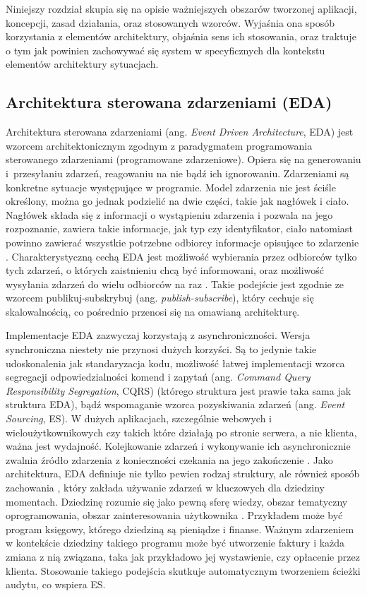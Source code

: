 \documentclass[a4paper]{book}
\newcommand{\obcy}[2]{{\selectlanguage{#1}#2}}
\newcommand{\ang}[1]{\emph{\obcy{british}{#1}}}
\begin{document}
{Niniejszy rozdział skupia się na opisie ważniejszych obszarów tworzonej aplikacji, koncepcji, zasad działania, oraz stosowanych wzorców. Wyjaśnia ona sposób korzystania z elementów architektury, objaśnia sens ich stosowania, oraz traktuje o tym jak powinien zachowywać się system w specyficznych dla kontekstu elementów architektury sytuacjach.

\subsection{Architektura sterowana zdarzeniami (EDA)}
Architektura sterowana zdarzeniami (ang. \ang{Event Driven Architecture}, EDA) jest wzorcem architektonicznym zgodnym z paradygmatem programowania sterowanego zdarzeniami (programowane zdarzeniowe). Opiera się na generowaniu i~przesyłaniu zdarzeń, reagowaniu na nie bądź ich ignorowaniu. Zdarzeniami są konkretne sytuacje występujące w programie. Model zdarzenia nie jest ściśle określony, można go jednak podzielić na dwie części, takie jak nagłówek i ciało. Nagłówek składa się z informacji o wystąpieniu zdarzenia i pozwala na jego rozpoznanie, zawiera takie informacje, jak typ czy identyfikator, ciało natomiast powinno zawierać wszystkie potrzebne odbiorcy informacje opisujące to zdarzenie \cite{id:EDA_BrendaMichelson}. Charakterystyczną cechą EDA jest możliwość wybierania przez odbiorców tylko tych zdarzeń, o których zaistnieniu chcą być informowani, oraz możliwość wysyłania zdarzeń do wielu odbiorców na raz \cite{id:maximeKlusman}. Takie podejście jest zgodnie ze wzorcem publikuj-subskrybuj (ang. \ang{publish-subscribe}), który cechuje się skalowalnością, co pośrednio przenosi się na omawianą architekturę.

Implementacje EDA zazwyczaj korzystają z asynchroniczności. Wersja synchroniczna niestety nie przynosi dużych korzyści. Są to jedynie takie udoskonalenia jak standaryzacja kodu, możliwość łatwej implementacji wzorca segregacji odpowiedzialności komend i zapytań (ang. \ang{Command Query Responsibility Segregation}, CQRS) (którego struktura jest prawie taka sama jak struktura EDA), bądź wspomaganie wzorca pozyskiwania zdarzeń (ang. \ang{Event Sourcing}, ES). W dużych aplikacjach, szczególnie webowych i wieloużytkownikowych czy takich które działają po stronie serwera, a nie klienta, ważna jest wydajność. Kolejkowanie zdarzeń i wykonywanie ich asynchronicznie zwalnia źródło zdarzenia z konieczności czekania na jego zakończenie \cite{id:hohpe2006programming,id:maximeKlusman}. Jako architektura, EDA definiuje nie tylko pewien rodzaj struktury, ale również sposób zachowania \cite{id:ibm_Architecture}, który zakłada używanie zdarzeń w kluczowych dla dziedziny momentach. Dziedzinę rozumie się jako pewną sferę wiedzy, obszar tematyczny oprogramowania, obszar zainteresowania użytkownika \cite{id:sobotka_SDJ-DDD,id:DDD_Evans}. Przykładem może być program księgowy, którego dziedziną są pieniądze i finanse. Ważnym zdarzeniem w kontekście dziedziny takiego programu może być utworzenie faktury i każda zmiana z nią związana, taka jak przykładowo jej wystawienie, czy opłacenie przez klienta. Stosowanie takiego podejścia skutkuje automatycznym tworzeniem ścieżki audytu, co wspiera ES.

}
\end{document}
